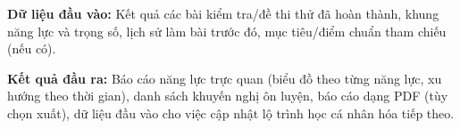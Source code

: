 \documentclass[12pt,a4paper]{article}
\newcommand{\ucfield}[2]{\noindent\textbf{#1: } #2\par\vspace{0.35em}}
\begin{document}
	\ucfield{Dữ liệu đầu vào}{Kết quả các bài kiểm tra/đề thi thử đã hoàn thành, khung năng lực và trọng số, lịch sử làm bài trước đó, mục tiêu/điểm chuẩn tham chiếu (nếu có).}
	
	\ucfield{Kết quả đầu ra}{Báo cáo năng lực trực quan (biểu đồ theo từng năng lực, xu hướng theo thời gian), danh sách khuyến nghị ôn luyện, báo cáo dạng PDF (tùy chọn xuất), dữ liệu đầu vào cho việc cập nhật lộ trình học cá nhân hóa tiếp theo.}
	
\end{document}
